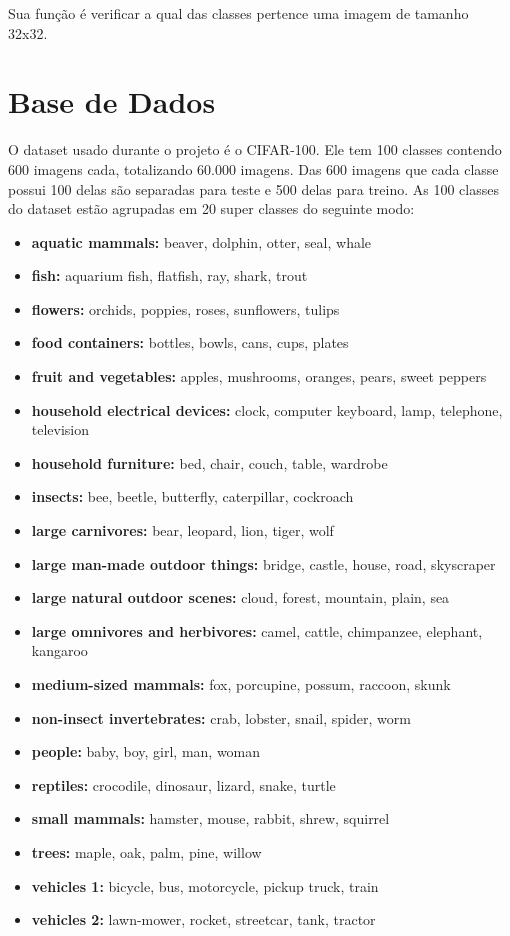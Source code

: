 \documentclass[conference]{IEEEtran}
\begin{document}
Sua função é verificar a qual das classes pertence uma imagem de tamanho 32x32.

\section{Base de Dados}

O dataset usado durante o projeto é o CIFAR-100.
Ele tem 100 classes contendo 600 imagens cada, totalizando 60.000 imagens.
Das 600 imagens que cada classe possui 100 delas são separadas para teste e 500 delas para treino.
As 100 classes do dataset estão agrupadas em 20 super classes do seguinte modo\cite{dataset}:

\begin{itemize}
    \item \textbf{aquatic mammals:} 	beaver, dolphin, otter, seal, whale
    \item \textbf{fish:} 	aquarium fish, flatfish, ray, shark, trout
    \item \textbf{flowers:} 	orchids, poppies, roses, sunflowers, tulips
    \item \textbf{food containers:} 	bottles, bowls, cans, cups, plates
    \item \textbf{fruit and vegetables:} 	apples, mushrooms, oranges, pears, sweet peppers
    \item \textbf{household electrical devices:} 	clock, computer keyboard, lamp, telephone, television
    \item \textbf{household furniture:} 	bed, chair, couch, table, wardrobe
    \item \textbf{insects:} 	bee, beetle, butterfly, caterpillar, cockroach
    \item \textbf{large carnivores:} 	bear, leopard, lion, tiger, wolf
    \item \textbf{large man-made outdoor things:} 	bridge, castle, house, road, skyscraper
    \item \textbf{large natural outdoor scenes:} 	cloud, forest, mountain, plain, sea
    \item \textbf{large omnivores and herbivores:} 	camel, cattle, chimpanzee, elephant, kangaroo
    \item \textbf{medium-sized mammals:} 	fox, porcupine, possum, raccoon, skunk
    \item \textbf{non-insect invertebrates:} 	crab, lobster, snail, spider, worm
    \item \textbf{people:} 	baby, boy, girl, man, woman
    \item \textbf{reptiles:} 	crocodile, dinosaur, lizard, snake, turtle
    \item \textbf{small mammals:} 	hamster, mouse, rabbit, shrew, squirrel
    \item \textbf{trees:} 	maple, oak, palm, pine, willow
    \item \textbf{vehicles 1:} 	bicycle, bus, motorcycle, pickup truck, train
    \item \textbf{vehicles 2:}	lawn-mower, rocket, streetcar, tank, tractor

\end{itemize}
\cite{dataset}
\end{document}
